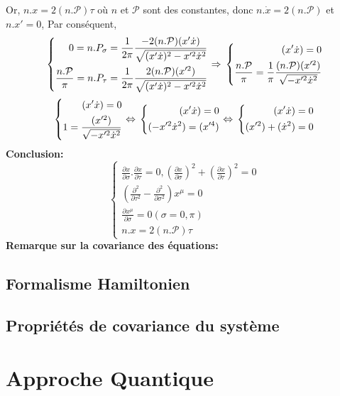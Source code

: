 \documentclass[a4paper,12pt]{article}
\def\xmu{x^\mu}
\begin{document}
Or, $n.x=2(n.\mathcal{P})\tau$ où $n$ et $\mathcal{P}$ sont des constantes,
donc $n.\dot{x}=2(n.\mathcal{P})$ et $n.x'=0$,
Par conséquent, 
\begin{equation}
	\left\lbrace
	\begin{aligned}
	0=n.P_\sigma=\frac{1}{2\pi}\frac{-2(n.\mathcal{P})(x'\dot{x})}{\sqrt{(x'\dot{x})^2-x'^2\dot{x}^2}}\\
	\frac{n.\mathcal{P}}{\pi}=n.P_\tau=\frac{1}{2\pi}\frac{2(n.\mathcal{P}) (x'^2)}{\sqrt{(x'\dot{x})^2-x'^2\dot{x}^2}}
	\end{aligned}
	\right.
	\Rightarrow\\
	\left\lbrace
	\begin{aligned}
	(x'\dot{x})=0\\
	\frac{n.\mathcal{P}}{\pi}=\frac{1}{\pi}\frac{(n.\mathcal{P}) (x'^2)}{\sqrt{-x'^2\dot{x}^2}}
	\end{aligned}
	\right.	
\end{equation}
\begin{equation}
	\left\lbrace
	\begin{aligned}
	(x'\dot{x})=0\\
	1=\frac{ (x'^2)}{\sqrt{-x'^2\dot{x}^2}}
	\end{aligned}
	\right.
	\Leftrightarrow\\
	\left\lbrace
	\begin{aligned}
	(x'\dot{x})=0\\
	(-x'^2\dot{x}^2)=(x'^4)
	\end{aligned}
	\right.	
	\Leftrightarrow\\
	\left\lbrace
	\begin{aligned}
	(x'\dot{x})=0\\
	(x'^2)+(\dot{x}^2)=0
	\end{aligned}
	\right.	
\end{equation}
\textbf{Conclusion:}
\begin{equation}
	\left\lbrace
    \begin{aligned}
        \frac{\partial x}{\partial \sigma}.\frac{\partial x}{\partial \tau}=0, \left( \frac{\partial x}{\partial \sigma}\right) ^2+\left( \frac{\partial x}{\partial \tau}\right) ^2=0\\
        \left( \frac{\partial^2}{\partial  \tau^2}-\frac{\partial^2}{\partial  \sigma^2}\right) \xmu=0\\
        \frac{\partial \xmu}{\partial \sigma}=0 	 (\sigma=0,\pi)\\
        n.x=2(n.\mathcal{P})\tau
        \end{aligned}
        \right.
\end{equation}
\textbf{Remarque sur la covariance des équations:}
\subsection{Formalisme Hamiltonien}
\subsection{Propriétés de covariance du système}
\section{Approche Quantique}
\end{document}
